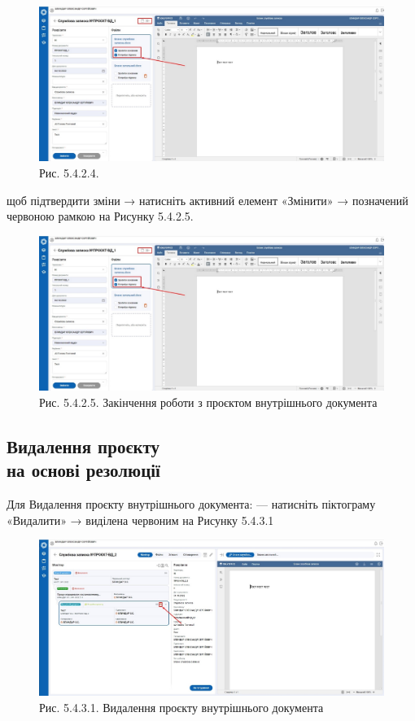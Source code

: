 \begin{figure}[!htbp]
\centerline{\includegraphics[width=\textwidth]{img/5.4.2.4.jpg}}
\caption{Рис. 5.4.2.4. }
\end{figure}

щоб підтвердити зміни → натисніть активний елемент «Змінити» →
позначений червоною рамкою на Рисунку 5.4.2.5.

\begin{figure}[!htbp]
\centerline{\includegraphics[width=\textwidth]{img/5.4.2.4.jpg}}
\caption{Рис. 5.4.2.5. Закінчення роботи з проєктом внутрішнього документа}
\end{figure}

\subsection{Видалення проєкту \\ на основі резолюції}

Для Видалення проєкту внутрішнього документа:
--- натисніть піктограму «Видалити» → виділена червоним на Рисунку 5.4.3.1

\begin{figure}[!htbp]
\centerline{\includegraphics[width=\textwidth]{img/5.4.3.1.jpg}}
\caption{Рис. 5.4.3.1. Видалення проєкту внутрішнього документа}
\end{figure}

